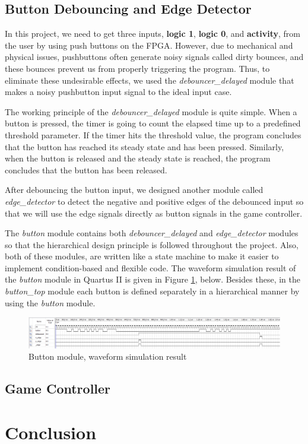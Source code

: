 \documentclass[conference]{IEEEtran}
\begin{document}
\subsection{Button Debouncing and Edge Detector}
In this project, we need to get three inputs, \textbf{logic 1}, \textbf{logic 0}, and \textbf{activity}, from the user by using push buttons on the FPGA. However, due to mechanical and physical issues, pushbuttons often generate noisy signals called dirty bounces, and these bounces prevent us from properly triggering the program. Thus, to eliminate these undesirable effects, we used the \textit{debouncer\_delayed} module that makes a noisy pushbutton input signal to the ideal input case. \\
\par The working principle of the \textit{debouncer\_delayed} module is quite simple. When a button is pressed, the timer is going to count the elapsed time up to a predefined threshold parameter. If the timer hits the threshold value, the program concludes that the button has reached its steady state and has been pressed. Similarly, when the button is released and the steady state is reached, the program concludes that the button has been released. \\
\par After debouncing the button input, we designed another module called \textit{edge\_detector} to detect the negative and positive edges of the debounced input so that we will use the edge signals directly as button signals in the game controller. \\
\par The \textit{button} module contains both \textit{debouncer\_delayed} and \textit{edge\_detector} modules so that the hierarchical design principle is followed throughout the project. Also, both of these modules, are written like a state machine to make it easier to implement condition-based and flexible code. The waveform simulation result of the \textit{button} module in Quartus II is given in Figure \ref{Fig. 1.}, below. Besides these, in the \textit{button\_top} module each button is defined separately in a hierarchical manner by using the \textit{button} module.
 \begin{figure}[H]
   \centerline{\includegraphics[scale=0.22]{simulation.png}}
    \caption{Button module, waveform simulation result}
    \label{Fig. 1.}
\end{figure} 
\subsection{Game Controller}

\section{Conclusion}



\end{document}
